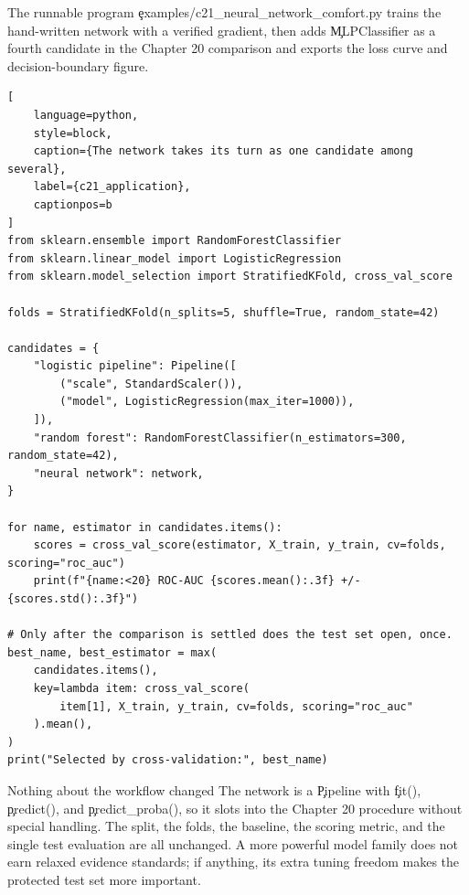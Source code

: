 The runnable program \c{examples/c21_neural_network_comfort.py} trains the
hand-written network with a verified gradient, then adds \c{MLPClassifier} as a
fourth candidate in the Chapter 20 comparison and exports the loss curve and
decision-boundary figure.

\begin{lstlisting}[
    language=python,
    style=block,
    caption={The network takes its turn as one candidate among several},
    label={c21_application},
    captionpos=b
]
from sklearn.ensemble import RandomForestClassifier
from sklearn.linear_model import LogisticRegression
from sklearn.model_selection import StratifiedKFold, cross_val_score

folds = StratifiedKFold(n_splits=5, shuffle=True, random_state=42)

candidates = {
    "logistic pipeline": Pipeline([
        ("scale", StandardScaler()),
        ("model", LogisticRegression(max_iter=1000)),
    ]),
    "random forest": RandomForestClassifier(n_estimators=300, random_state=42),
    "neural network": network,
}

for name, estimator in candidates.items():
    scores = cross_val_score(estimator, X_train, y_train, cv=folds, scoring="roc_auc")
    print(f"{name:<20} ROC-AUC {scores.mean():.3f} +/- {scores.std():.3f}")

# Only after the comparison is settled does the test set open, once.
best_name, best_estimator = max(
    candidates.items(),
    key=lambda item: cross_val_score(
        item[1], X_train, y_train, cv=folds, scoring="roc_auc"
    ).mean(),
)
print("Selected by cross-validation:", best_name)
\end{lstlisting}

\begin{SyntaxBox}{Nothing about the workflow changed}
The network is a \c{Pipeline} with \c{fit()}, \c{predict()}, and
\c{predict_proba()}, so it slots into the Chapter 20 procedure without special
handling. The split, the folds, the baseline, the scoring metric, and the
single test evaluation are all unchanged. A more powerful model family does not
earn relaxed evidence standards; if anything, its extra tuning freedom makes
the protected test set more important.
\end{SyntaxBox}


